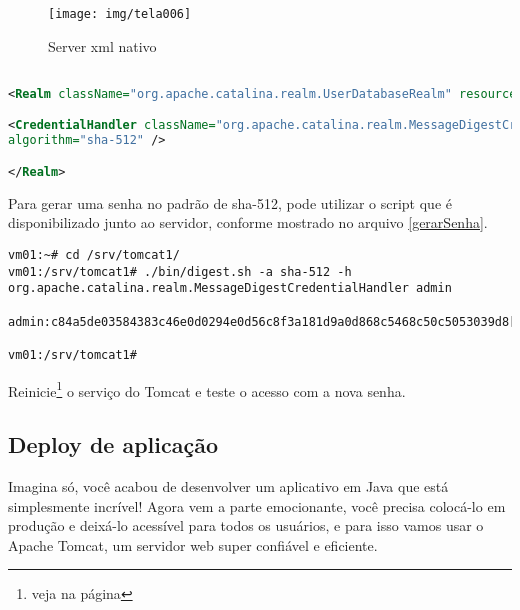 \begin{figure}[H]
	\centering
	\caption[server.xml]{Server xml nativo}
	\texttt{[image: img/tela006]}
	\label{fig:tomcat-realm-nativo}
\end{figure}


\begin{lstlisting}[language=xml, caption=\firacoderetina{server.xml}, basicstyle=\scriptsize\firacoderetina, 
label=realm512, showspaces=false, showtabs=false, showstringspaces='', firstnumber=139]	

<Realm className="org.apache.catalina.realm.UserDatabaseRealm" resourceName="UserDatabase">

<CredentialHandler className="org.apache.catalina.realm.MessageDigestCredentialHandler"
algorithm="sha-512" />

</Realm>

\end{lstlisting}

Para gerar uma senha no padrão de sha-512, pode utilizar o script que é disponibilizado junto ao servidor, conforme mostrado no arquivo \ref{gerarSenha}.	

\begin{lstlisting}[breaklines=true,basicstyle=\ttfamily, 
label=gerarSenha ,
breaklines=true,caption=\firacoderetina gerando senha,
postbreak=\mbox{\textcolor{red}{$\hookrightarrow$}\space},
showstringspaces=false]
vm01:~# cd /srv/tomcat1/
vm01:/srv/tomcat1# ./bin/digest.sh -a sha-512 -h org.apache.catalina.realm.MessageDigestCredentialHandler admin

admin:c84a5de03584383c46e0d0294e0d56c8f3a181d9a0d868c5468c50c5053039d8[...] 

vm01:/srv/tomcat1#

\end{lstlisting}

Reinicie\footnote{ veja na página \pageref{restartTomcat}} o serviço do Tomcat e teste o acesso com a nova senha.

\subsection{Deploy de aplicação}

Imagina só, você acabou de desenvolver um aplicativo em Java que está simplesmente incrível! Agora vem a parte emocionante, você precisa colocá-lo em produção e deixá-lo acessível para todos os usuários, e para isso vamos usar o Apache Tomcat, um servidor web super confiável e eficiente.

